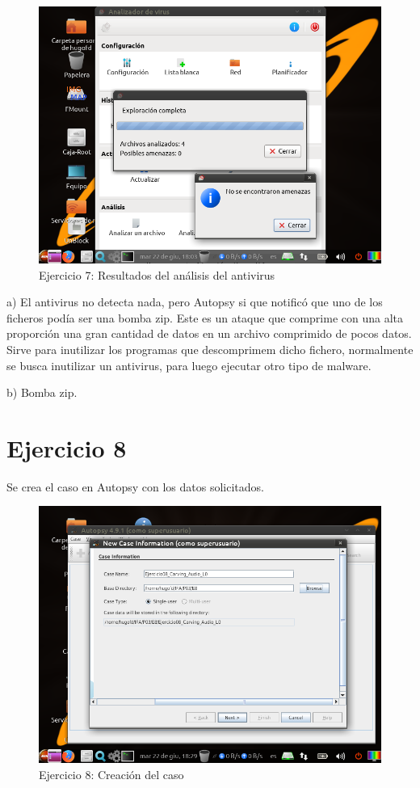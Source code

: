 \documentclass[11pt]{article}
\begin{document}
\begin{figure}[H]
    \caption{Ejercicio 7: Resultados del análisis del antivirus}
    \centering
    \includegraphics[scale=0.7]{e7-7.png}
\end{figure}

a) El antivirus no detecta nada, pero Autopsy si que notificó que uno de los ficheros podía ser una bomba zip. Este es un ataque que comprime con una alta proporción una gran cantidad de datos en un archivo comprimido de pocos datos. Sirve para inutilizar los programas que descomprimem dicho fichero, normalmente se busca inutilizar un antivirus, para luego ejecutar otro tipo de malware.

b) Bomba zip.

\section{Ejercicio 8}
Se crea el caso en Autopsy con los datos solicitados.

\begin{figure}[H]
    \caption{Ejercicio 8: Creación del caso}
    \centering
    \includegraphics[scale=0.7]{e8-1.png}
\end{figure}
\end{document}
